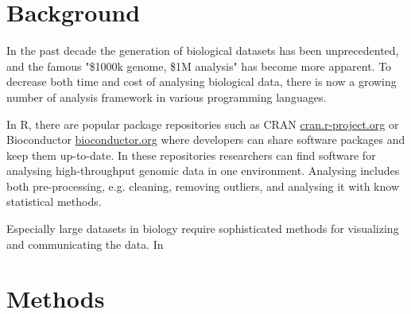 
\section*{Background}

%
%

In the past decade the generation of biological datasets has been unprecedented, and the famous "\$1000k genome, \$1M analysis"\cite{} has become more apparent. To decrease both time and cost of analysing biological data, there is now a growing number of analysis framework in various programming languages. \cite{}

In R, there are popular package repositories such as CRAN \url{cran.r-project.org} or Bioconductor \url{bioconductor.org} where developers can share software packages and keep them up-to-date. In these repositories researchers can find software for analysing high-throughput genomic data in one environment. Analysing includes both pre-processing, e.g. cleaning, removing outliers, and analysing it with know statistical methods.

Especially large datasets in biology require sophisticated methods for visualizing and communicating the data. In



\section*{Methods}




